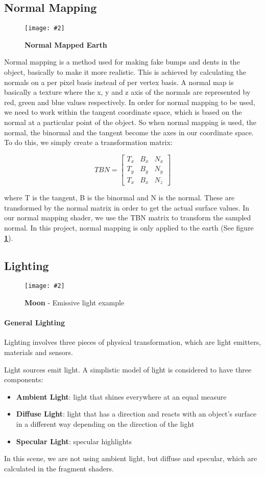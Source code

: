 \documentclass[10pt, a4paper]{article}
\newcommand{\figuremacro}[5]{
    \begin{figure}[#1]
        \centering
        \texttt{[image: \#2]}
        \caption[#3]{\textbf{#3}#4}
        \label{fig:#2}
    \end{figure}
}
\begin{document}
\subsection{Normal Mapping}
		
	\figuremacro{H}{Earth}{Normal Mapped Earth}{ }{1.0}
	
	Normal mapping is a method used for making fake bumps and dents in the object, basically to make it more realistic. This is achieved by calculating the normals on a per pixel basis instead of per vertex basis. A normal map is basically a texture  where the x, y and z axis of the normals are represented by red, green and blue values respectively. In order for normal mapping to be used, we need to work within the tangent coordinate space, which is based on the normal at a particular point of the object. So when normal mapping is used, the normal, the binormal and the tangent become the axes in our coordinate space. To do this, we simply create a transformation matrix:
	
	    \[
	    TBN=
	    \begin{bmatrix}
	    T_x & B_x & N_x  \\
	    T_y & B_y & N_y  \\
	    T_x & B_x & N_z
	    \end{bmatrix}
	    \]
	    
	where T is the tangent, B is the binormal and N is the normal. These are transformed by the normal matrix in order to get the actual surface values. In our normal mapping shader, we use the TBN matrix to transform the sampled normal. In this project, normal mapping is only applied to the earth (See figure \textbf{\ref{fig:Earth}}).
	
\subsection{Lighting}

	\figuremacro{H}{Moon}{Moon}{ - Emissive light example}{1.0}

	\paragraph{General Lighting} Lighting involves three pieces of physical transformation, which are light emitters, materials and sensors. 
	
	Light sources emit light. A simplistic model of light is considered to have three components:
		\begin{itemize}
			\item \textbf{Ambient Light}: light that shines everywhere at an equal measure
			\item \textbf{Diffuse Light}: light that has a direction and reacts with an object's surface in a different  way depending on the direction of the light
			\item \textbf{Specular Light}: specular highlights
		\end{itemize}
	In this scene, we are not using ambient light, but diffuse and specular, which are calculated in the fragment shaders.
	
\end{document}
